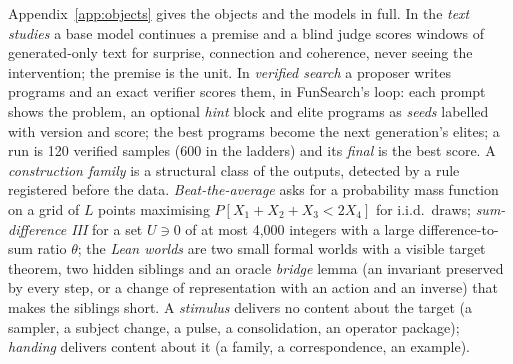 \documentclass[11pt]{article}
\begin{document}
Appendix~\ref{app:objects} gives the objects and the models in full. In
the \emph{text studies} a base model continues a premise and a blind judge
scores windows of generated-only text for surprise, connection and
coherence, never seeing the intervention; the premise is the unit. In
\emph{verified search} a proposer writes programs and an exact verifier
scores them, in FunSearch's loop: each prompt shows the problem, an
optional \emph{hint} block and elite programs as \emph{seeds} labelled with
version and score; the best programs become the next generation's elites;
a run is 120 verified samples (600 in the ladders) and its \emph{final} is
the best score. A \emph{construction family} is a structural class of the
outputs, detected by a rule registered before the data.
\emph{Beat-the-average} asks for a probability mass function on a grid of
$L$ points maximising $P[X_1{+}X_2{+}X_3<2X_4]$ for i.i.d.\ draws;
\emph{sum-difference III} for a set $U\ni0$ of at most 4{,}000 integers
with a large difference-to-sum ratio $\theta$; the \emph{Lean worlds} are
two small formal worlds with a visible target theorem, two hidden siblings
and an oracle \emph{bridge} lemma (an invariant preserved by every step, or
a change of representation with an action and an inverse) that makes the
siblings short. A \emph{stimulus} delivers no content about the target (a
sampler, a subject change, a pulse, a consolidation, an operator package);
\emph{handing} delivers content about it (a family, a correspondence, an
example).
\end{document}
